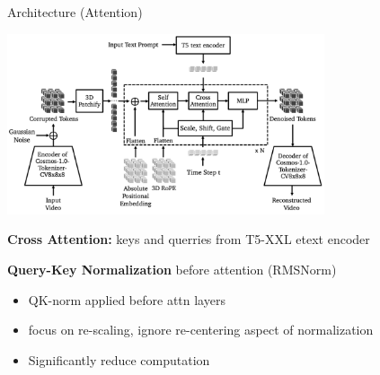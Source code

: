 \documentclass{beamer}
\begin{document}
\begin{frame}[t]{Architecture (Attention)}
    \vspace{-1.6em}
    \begin{center}
        \includegraphics[width=0.7\textwidth]{./img/diffusion_arch.png}
    \end{center}
    \textbf{Cross Attention:} keys and querries from T5-XXL etext encoder\newline

    \textbf{Query-Key Normalization} before attention (RMSNorm) 
    \begin{itemize}[label=-]
        \item  QK-norm applied before attn layers
        \item  focus on re-scaling, ignore re-centering aspect of normalization
        \item Significantly reduce computation
   \end{itemize}
\end{frame}
\end{document}
